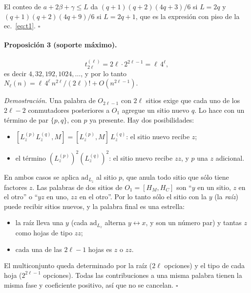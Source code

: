 \documentclass[11pt,a4paper]{article}
\begin{document}
El conteo de $a+2\beta+\gamma\leq L$ da $(q+1)(q+2)(4q+3)/6$ si $L=2q$ y $(q+1)(q+2)(4q+9)/6$ si
$L=2q+1$, que es la expresión con piso de la ec.~\eqref{eq:t1}. \hfill$\square$

\paragraph{Proposición 3 (soporte máximo).}
\begin{equation}
  t^{(\ell)}_{2\ell}=2\ell\cdot2^{2\ell-1}=\ell\,4^\ell ,
  \label{eq:t2l}
\end{equation}
es decir $4,32,192,1024,\dots$, y por lo tanto
$N_\ell(n)=\ell\,4^\ell\,n^{2\ell}/(2\ell)!+O(n^{2\ell-1})$.

\emph{Demostración.} Una palabra de $O_{2\ell-1}$ con $2\ell$ sitios exige que cada uno de los
$2\ell-2$ conmutadores posteriores a $O_1$ agregue un sitio nuevo $q$. Lo hace con un término de par
$\{p,q\}$, con $p$ ya presente. Hay dos posibilidades:
\begin{itemize}
\item $[L_z^{(p)}L_z^{(q)},M]=[L_z^{(p)},M]\,L_z^{(q)}$: el sitio nuevo recibe $z$;
\item el término $(L_z^{(p)})^2(L_z^{(q)})^2$: el sitio nuevo recibe $zz$, y $p$ una $z$ adicional.
\end{itemize}
En ambos casos se aplica $\mathrm{ad}_{L_z}$ al sitio $p$, que anula todo sitio que sólo tiene
factores $z$. Las palabras de dos sitios de $O_1=[H_M,H_C]$ son ``$y$ en un sitio, $z$ en el otro'' o
``$yz$ en uno, $zz$ en el otro''. Por lo tanto sólo el sitio con la $y$ (la \emph{raíz}) puede recibir
sitios nuevos, y la palabra final es una estrella:
\begin{itemize}
\item la raíz lleva una $y$ (cada $\mathrm{ad}_{L_z}$ alterna $y\leftrightarrow x$, y son un número par)
  y tantas $z$ como hojas de tipo $zz$;
\item cada una de las $2\ell-1$ hojas es $z$ o $zz$.
\end{itemize}
El multiconjunto queda determinado por la raíz ($2\ell$ opciones) y el tipo de cada hoja ($2^{2\ell-1}$
opciones). Todas las contribuciones a una misma palabra tienen la misma fase y coeficiente
positivo, así que no se cancelan. \hfill$\square$
\end{document}
